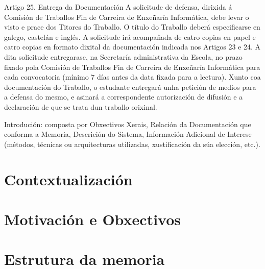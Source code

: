  
Artigo 25. Entrega da Documentación 
A solicitude de defensa, dirixida á Comisión de Traballos Fin de Carreira de Enxeñaría Informática, 
debe  levar  o  visto  e  prace  dos  Titores  do  Traballo.  O  título  do  Traballo  deberá  especificarse  en 
galego, castelán e inglés. A solicitude irá acompañada de catro copias en papel e catro copias en 
formato dixital da documentación indicada nos Artigos 23 e 24. A dita solicitude entregarase, na 
Secretaría administrativa da Escola, no prazo fixado pola Comisión de Traballos Fin de Carreira de 
Enxeñaría Informática para cada convocatoria (mínimo 7 días antes da data fixada para a lectura). 
Xunto  coa  documentación  do  Traballo,  o  estudante  entregará  unha  petición  de  medios  para  a 
defensa do mesmo, e asinará a correspondente autorización de difusión e a declaración de que se 
trata dun traballo orixinal. 

Introdución: composta por Obxectivos Xerais, Relación da Documentación que conforma a Memoria, Descrición do Sistema, Información Adicional de Interese (métodos, técnicas ou arquitecturas utilizadas, xustificación da súa elección, etc.).
 
\section{Contextualización}
\section{Motivación e Obxectivos}
\section{Estrutura da memoria}
